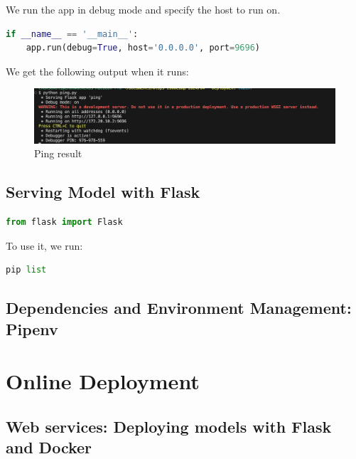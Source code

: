 \documentclass[letterpaper,12pt,notitlepage,twoside]{report}
\begin{document}
We run the app in debug mode and specify the host to run on.
\begin{lstlisting}[language=python, numbers=none]
if __name__ == '__main__':
    app.run(debug=True, host='0.0.0.0', port=9696)
\end{lstlisting}

We get the following output when it runs:
\begin{figure}[h]
	\centering
	\includegraphics[width=\textwidth]{Images/ping.png}
	\caption{Ping result}
	\label{fig:9}
\end{figure}
\FloatBarrier


\subsection{Serving Model with Flask}

\begin{lstlisting}[language=python, numbers=none]
from flask import Flask
\end{lstlisting}

To use it, we run:
\begin{lstlisting}[language=python, numbers=none]
pip list
\end{lstlisting}

\subsection{Dependencies and Environment Management: Pipenv}


\section{Online Deployment}
\subsection{Web services: Deploying models with Flask and Docker}
\end{document}
